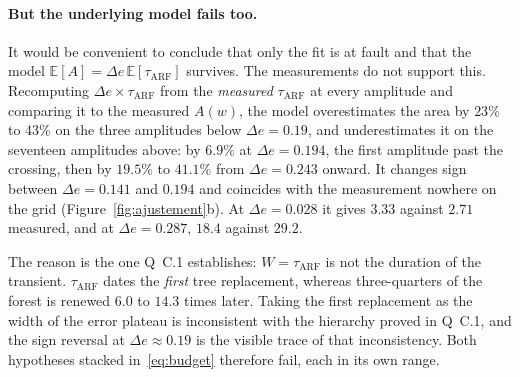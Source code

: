 \documentclass[11pt,a4paper]{article}
\begin{document}
\paragraph{But the underlying model fails too.} It would be convenient to conclude that
only the fit is at fault and that the model
$\mathbb{E}[A] = \Delta e\,\mathbb{E}[\tau_{\mathrm{ARF}}]$ survives. The measurements do
not support this. Recomputing $\Delta e \times \tau_{\mathrm{ARF}}$ from the
\emph{measured} $\tau_{\mathrm{ARF}}$ at every amplitude and comparing it to the measured
$A(w)$, the model overestimates the area by $23\%$ to $43\%$ on the three amplitudes
below $\Delta e = 0.19$, and underestimates it on the seventeen amplitudes above: by
$6.9\%$ at $\Delta e = 0.194$, the first amplitude past the crossing, then by $19.5\%$
to $41.1\%$ from $\Delta e = 0.243$ onward. It changes sign between $\Delta e = 0.141$
and $0.194$ and coincides with the measurement nowhere on the grid
(Figure~\ref{fig:ajustement}b). At $\Delta e = 0.028$ it gives $3.33$ against $2.71$
measured, and at $\Delta e = 0.287$, $18.4$ against $29.2$.

The reason is the one Q~C.1 establishes: $W = \tau_{\mathrm{ARF}}$ is not the duration of
the transient. $\tau_{\mathrm{ARF}}$ dates the \emph{first} tree replacement, whereas
three-quarters of the forest is renewed $6.0$ to $14.3$ times later. Taking the first
replacement as the width of the error plateau is inconsistent with the hierarchy proved in
Q~C.1, and the sign reversal at $\Delta e \approx 0.19$ is the visible trace of that
inconsistency. Both hypotheses stacked in~\eqref{eq:budget} therefore fail, each in its
own range.

\begin{center}
\end{center}
\end{document}
